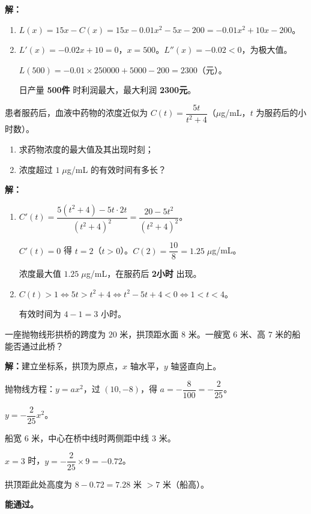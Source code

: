 \documentclass[12pt, a4paper]{ctexart}
\begin{document}
\textbf{解：}\quad
\begin{enumerate}[leftmargin=1.5em]
  \item $L(x)=15x-C(x)=15x-0.01x^2-5x-200=-0.01x^2+10x-200$。
  \item $L'(x)=-0.02x+10=0$，$x=500$。$L''(x)=-0.02<0$，为极大值。\par
  $L(500)=-0.01\times250000+5000-200=2300$（元）。\par
  日产量 \textbf{500件} 时利润最大，最大利润 \textbf{2300元}。
\end{enumerate}

\begin{appbox}[【应用2】药物浓度的函数模型]
患者服药后，血液中药物的浓度近似为 $C(t)=\dfrac{5t}{t^2+4}$（$\mu$g/mL，$t$ 为服药后的小时数）。
\begin{enumerate}[leftmargin=1.5em]
  \item 求药物浓度的最大值及其出现时刻；
  \item 浓度超过 $1\;\mu$g/mL 的有效时间有多长？
\end{enumerate}
\end{appbox}

\textbf{解：}\quad
\begin{enumerate}[leftmargin=1.5em]
  \item $C'(t)=\dfrac{5(t^2+4)-5t\cdot 2t}{(t^2+4)^2}=\dfrac{20-5t^2}{(t^2+4)^2}$。\par
  $C'(t)=0$ 得 $t=2$（$t>0$）。$C(2)=\dfrac{10}{8}=1.25\;\mu$g/mL。\par
  浓度最大值 $1.25\;\mu$g/mL，在服药后 \textbf{2小时} 出现。
  \item $C(t)>1 \Leftrightarrow 5t>t^2+4 \Leftrightarrow t^2-5t+4<0 \Leftrightarrow 1<t<4$。\par
  有效时间为 $4-1=3$ 小时。
\end{enumerate}

\begin{appbox}[【应用3】桥梁拱形与函数拟合]
一座抛物线形拱桥的跨度为 $20$ 米，拱顶距水面 $8$ 米。一艘宽 $6$ 米、高 $7$ 米的船能否通过此桥？
\end{appbox}

\textbf{解：}\quad 建立坐标系，拱顶为原点，$x$ 轴水平，$y$ 轴竖直向上。\par
抛物线方程：$y=ax^2$，过 $(10,-8)$，得 $a=-\dfrac{8}{100}=-\dfrac{2}{25}$。\par
$y=-\dfrac{2}{25}x^2$。\par
船宽 $6$ 米，中心在桥中线时两侧距中线 $3$ 米。\par
$x=3$ 时，$y=-\dfrac{2}{25}\times9=-0.72$。\par
拱顶距此处高度为 $8-0.72=7.28$ 米 $>7$ 米（船高）。\par
\textbf{能通过。}
\end{document}
